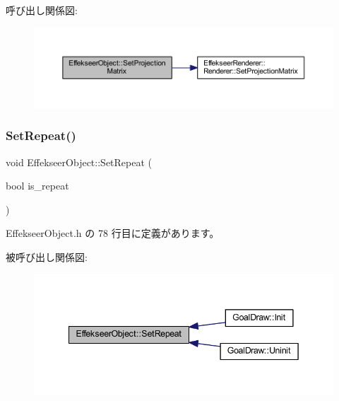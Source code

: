 呼び出し関係図\+:\nopagebreak
\begin{figure}[H]
\begin{center}
\leavevmode
\includegraphics[width=350pt]{class_effekseer_object_aa3849f176ccb493b162d08c1ef387996_cgraph}
\end{center}
\end{figure}
\mbox{\label{class_effekseer_object_a77122f2d71d44d6cceec2b6bdedb4b2a}} 
\subsubsection{\texorpdfstring{Set\+Repeat()}{SetRepeat()}}
{\footnotesize\ttfamily void Effekseer\+Object\+::\+Set\+Repeat (\begin{DoxyParamCaption}\item[{bool}]{is\+\_\+repeat }\end{DoxyParamCaption})\hspace{0.3cm}{\ttfamily [inline]}}



 Effekseer\+Object.\+h の 78 行目に定義があります。

被呼び出し関係図\+:\nopagebreak
\begin{figure}[H]
\begin{center}
\leavevmode
\includegraphics[width=342pt]{class_effekseer_object_a77122f2d71d44d6cceec2b6bdedb4b2a_icgraph}
\end{center}
\end{figure}
\mbox{\label{class_effekseer_object_a3c14fd4215640b648b14e445b99564f7}} 
